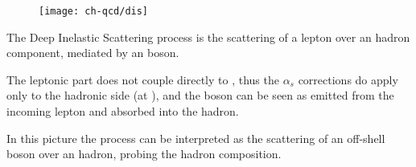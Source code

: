 \begin{figure}
	\centering
	\texttt{[image: ch-qcd/dis]}
\end{figure}

The Deep Inelastic Scattering process is the scattering of a lepton over an
hadron component, mediated by an \ew boson.

The leptonic part does not couple directly to \qcd , thus the $\alpha_s$
corrections do apply only to the hadronic side (at \lo \ew), and the \ew boson
can be seen as emitted from the incoming lepton and absorbed into the hadron.

In this picture the process can be interpreted as the scattering of an
off-shell \ew boson over an hadron, probing the hadron composition.
